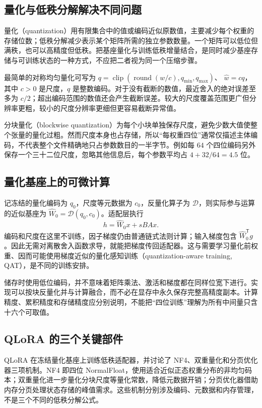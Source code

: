 \documentclass[UTF8,12pt,a4paper,fontset=fandol]{ctexart}
\begin{document}
\subsection{量化与低秩分解解决不同问题}

量化（quantization）用有限集合中的值或编码近似原数值，主要减少每个权重的存储位数；低秩分解减少表示某个矩阵所需的独立参数数量。一个矩阵可以低位但满秩，也可以高精度但低秩。把基座量化与训练低秩增量结合，是同时减少基座存储与可训练状态的一种方式，不应把二者视为同一个压缩步骤。

最简单的对称均匀量化可写为
$q=\operatorname{clip}(\operatorname{round}(w/c),q_{\min},q_{\max})$、
$\widehat w=cq$，其中 $c>0$ 是尺度，$q$ 是整数编码。对于没有截断的数值，最近舍入的绝对误差至多为 $c/2$；超出编码范围的数值还会产生截断误差。较大的尺度覆盖范围更广但分辨率更粗，较小的尺度分辨率更细但更容易截断异常值。

分块量化（blockwise quantization）为每个小块单独保存尺度，避免少数大值使整个张量的量化过粗。然而尺度本身也占存储，所以“每权重四位”通常仅描述主体编码，不代表整个文件精确地只占参数数目的一半字节。例如每 $64$ 个四位编码另外保存一个三十二位尺度，忽略其他信息后，每个参数平均占 $4+32/64=4.5$ 位。

\subsection{量化基座上的可微计算}

记冻结的量化编码为 $q_0$，尺度等元数据为 $c_0$，反量化算子为
$\mathcal D$，则实际参与运算的近似基座为
$\widehat W_0=\mathcal D(q_0,c_0)$。适配层执行
\begin{equation}
h=\widehat W_0x+sBAx.
\label{eq:qlora-forward}
\end{equation}
编码和尺度在这里不训练，因子梯度仍由普通链式法则计算；输入梯度包含
$\widehat W_0^{\mathsf T}g$。因此无需对离散舍入函数求导，就能把梯度传回适配器。这与需要学习量化前权重、因而可能使用梯度近似的量化感知训练（quantization-aware training, QAT），是不同的训练安排。

储存时使用低位编码，并不意味着矩阵乘法、激活和梯度都在同样位宽下进行。实现可以按块反量化并与计算融合，而不必在显存中永久保存完整高精度副本。计算精度、累积精度和存储精度应分别说明，不能把“四位训练”理解为所有中间量只含十六个可取值。

\subsection{QLoRA 的三个关键部件}

QLoRA 在冻结量化基座上训练低秩适配器，并讨论了 NF4、双重量化和分页优化器三项机制\cite{dettmers2023}。NF4 即四位 NormalFloat，使用适合近似正态权重分布的非均匀码本；双重量化进一步量化分块尺度等量化常数，降低元数据开销；分页优化器借助内存分页处理状态存储的峰值需求。这些机制分别涉及编码、元数据和内存管理，不是三个不同的低秩分解公式。
\end{document}
